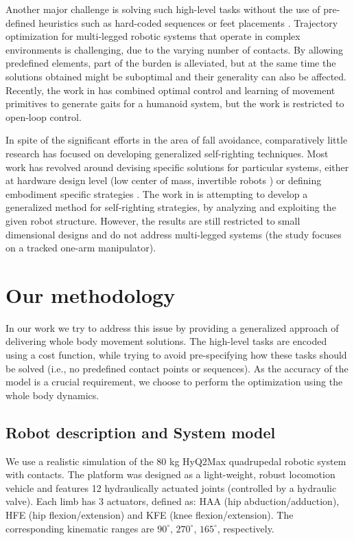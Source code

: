 \documentclass[usletter, 10pt, conference]{ieeeconf}      %
\begin{document}
Another major challenge is solving such high-level tasks without the use of 
pre-defined heuristics such as hard-coded sequences or feet 
placements \cite{Winkler2015}. Trajectory optimization for multi-legged robotic systems 
that operate in complex environments is challenging, due to the varying number 
of contacts. By allowing predefined elements, part of the burden is alleviated, 
but at the same time the solutions obtained might be suboptimal and their 
generality can also be affected. Recently, the work in \cite{clever2016novel} has combined optimal control and 
learning of movement primitives to generate gaits for a humanoid system, but the work is restricted to
open-loop control. 

In spite of the significant efforts in the area of fall avoidance, comparatively little research has focused
on developing generalized self-righting techniques. Most work has revolved around devising specific 
solutions for particular systems, either at hardware design level 
(low center of mass, invertible robots \cite{ben2008design}) or defining  embodiment specific strategies 
\cite{saranli2004model}. The work in \cite{kessens2014metric} is attempting to 
develop a generalized method for self-righting strategies, by analyzing and 
exploiting the given robot structure. However, the results are still restricted to 
small dimensional designs and do not address multi-legged systems (the study focuses on a tracked one-arm manipulator).

\section{Our methodology}

In our work we try to address this issue by providing a generalized approach of 
delivering whole body movement solutions. The high-level tasks are encoded 
using a cost function, while trying to avoid pre-specifying how these tasks 
should be solved (i.e., no predefined contact points or sequences). As the 
accuracy of the model is a crucial requirement, we choose to perform the optimization
using the whole body dynamics. 

\subsection{Robot description and System model}

We use a realistic simulation of the 80 kg HyQ2Max \cite{semini16tmech} 
quadrupedal robotic system with contacts. The platform was designed as a 
light-weight, robust locomotion vehicle and features 12 hydraulically actuated 
joints (controlled by a hydraulic valve). Each limb has 3 actuators, defined 
as: HAA (hip abduction/adduction), HFE (hip flexion/extension) and KFE (knee 
flexion/extension). The corresponding kinematic ranges are $90^{\circ}$, 
$270^{\circ}$, $165^{\circ}$, respectively. 
\end{document}
